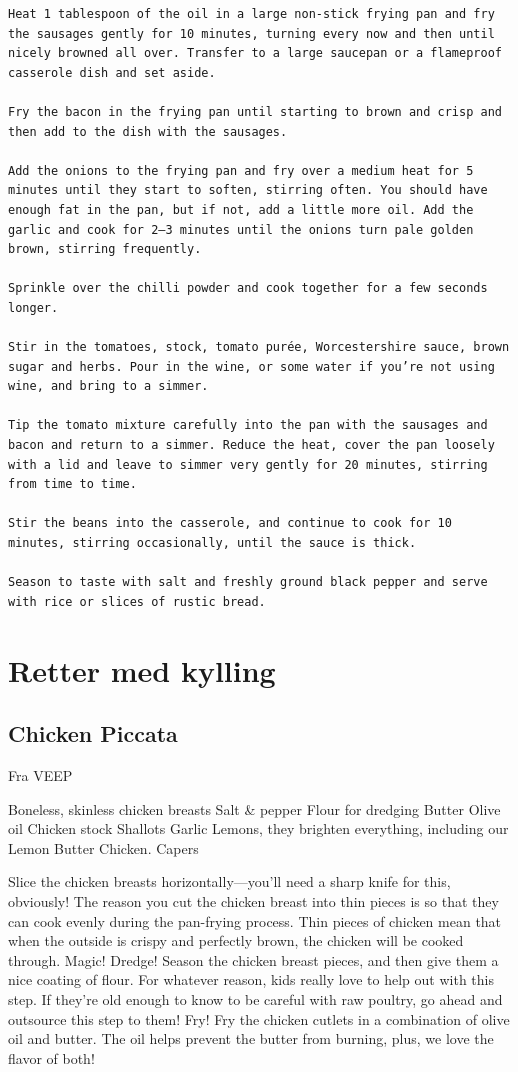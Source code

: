\documentclass[
]{book}
\begin{document}
\begin{verbatim}
Heat 1 tablespoon of the oil in a large non-stick frying pan and fry the sausages gently for 10 minutes, turning every now and then until nicely browned all over. Transfer to a large saucepan or a flameproof casserole dish and set aside.

Fry the bacon in the frying pan until starting to brown and crisp and then add to the dish with the sausages.

Add the onions to the frying pan and fry over a medium heat for 5 minutes until they start to soften, stirring often. You should have enough fat in the pan, but if not, add a little more oil. Add the garlic and cook for 2–3 minutes until the onions turn pale golden brown, stirring frequently.

Sprinkle over the chilli powder and cook together for a few seconds longer.

Stir in the tomatoes, stock, tomato purée, Worcestershire sauce, brown sugar and herbs. Pour in the wine, or some water if you’re not using wine, and bring to a simmer.

Tip the tomato mixture carefully into the pan with the sausages and bacon and return to a simmer. Reduce the heat, cover the pan loosely with a lid and leave to simmer very gently for 20 minutes, stirring from time to time.

Stir the beans into the casserole, and continue to cook for 10 minutes, stirring occasionally, until the sauce is thick.

Season to taste with salt and freshly ground black pepper and serve with rice or slices of rustic bread.
\end{verbatim}

\chapter{Retter med kylling}\label{retter-med-kylling}

\section{Chicken Piccata}\label{chicken-piccata}

Fra VEEP

Boneless, skinless chicken breasts
Salt \& pepper
Flour for dredging
Butter
Olive oil
Chicken stock
Shallots
Garlic
Lemons, they brighten everything, including our Lemon Butter Chicken.
Capers

Slice the chicken breasts horizontally---you'll need a sharp knife for this, obviously! The reason you cut the chicken breast into thin pieces is so that they can cook evenly during the pan-frying process. Thin pieces of chicken mean that when the outside is crispy and perfectly brown, the chicken will be cooked through. Magic!
Dredge! Season the chicken breast pieces, and then give them a nice coating of flour. For whatever reason, kids really love to help out with this step. If they're old enough to know to be careful with raw poultry, go ahead and outsource this step to them!
Fry! Fry the chicken cutlets in a combination of olive oil and butter. The oil helps prevent the butter from burning, plus, we love the flavor of both!
\end{document}
